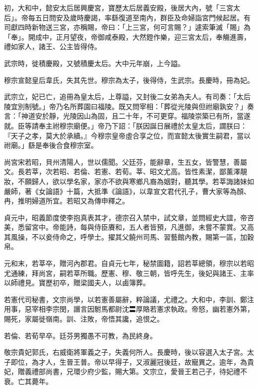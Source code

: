 \begin{pinyinscope}
 初，大和中，懿安太后居興慶宮，寶歷太后居義安殿，後居大內，號「三宮太后」。帝每五日問安及歲時慶謁，率繇復道至南內，群臣及命婦詣宮門候起居。有司獻四時新物送三宮，亦稱賜，帝曰：「上三宮，何可言賜？」遽索筆滅「賜」為「奉」。開成中，正月望夜，帝御咸泰殿，大然鐙作樂，迎三宮太后，奉觴進壽，禮如家人，諸王、公主皆得侍。



 武宗時，徙積慶殿，又號積慶太后。大中元年崩，上今謚。



 穆宗宣懿皇后韋氏，失其先世。穆宗為太子，後得侍，生武宗。長慶時，冊為妃。



 武宗立，妃已亡，追冊為皇太后，上尊謚，又封後二女弟為夫人。有司奏：「太后陵宜別制號。」帝乃名所葬園曰福陵。既又問宰相：「葬從光陵與但祔廟孰安？」奏言：「神道安於靜，光陵因山為固，且二十年，不可更穿。福陵崇築已有所，當遂就。臣等請奉主祔穆宗廟便。」帝乃下詔：「朕因誕日展禮於太皇太后，謂朕曰：『天子之孝，莫大於承續。』今穆宗皇帝虛合享之位，而宣懿太後實生嗣君，當以祔廟。」繇是奉後合食穆宗室。



 尚宮宋若昭，貝州清陽人，世以儒聞。父廷芬，能辭章，生五女，皆警慧，善屬文。長若莘，次若昭、若倫、若憲、若荀。莘、昭文尤高。皆性素潔，鄙薰澤靚妝，不願歸人，欲以學名家，家亦不欲與寒鄉凡裔為姻對，聽其學。若莘誨諸妹如嚴師，著《女論語》十篇，大抵準《論語》，以韋宣文君代孔子，曹大家等為顏、冉，推明婦道所宜。若昭又為傳申釋之。



 貞元中，昭義節度使李抱真表其才，德宗召入禁中，試文章，並問經史大誼，帝咨美，悉留宮中。帝能詩，每與侍臣賡和，五人者皆預，凡進御，未嘗不蒙賞。又高其風操，不以妾侍命之，呼學士。擢其父饒州司馬、習藝館內教，賜第一區，加穀帛。



 元和末，若莘卒，贈河內郡君。自貞元七年，秘禁圖籍，詔若莘總領，穆宗以若昭尤通練，拜尚宮，嗣若莘所職。歷憲、穆、敬三朝，皆呼先生，後妃與諸王、主率以師禮見。寶歷初卒，贈梁國夫人，以鹵簿葬。



 若憲代司秘書，文宗尚學，以若憲善屬辭，粹論議，尤禮之。大和中，李訓、鄭注用事，惡宰相李宗閔，譖言因駙馬都尉沈〓厚賂若憲求執政。帝怒，幽若憲外第，賜死，家屬徙嶺南。訓、注敗，帝悟其讒，追恨之。



 若倫、若荀早卒。廷芬男獨愚不可教，為民終身。



 敬宗貴妃郭氏，右威衛將軍義之子，失義何所人。長慶時，後以容選入太子宮。太子即位，為才人，生晉王普。帝以早得子，又淑麗冠後廷，故寵異之。逾年，為貴妃，贈義禮部尚書，兄環少府少監，賜大第。文宗立，愛晉王若己子，待妃禮不衰。亡其薨年。




\end{pinyinscope}
